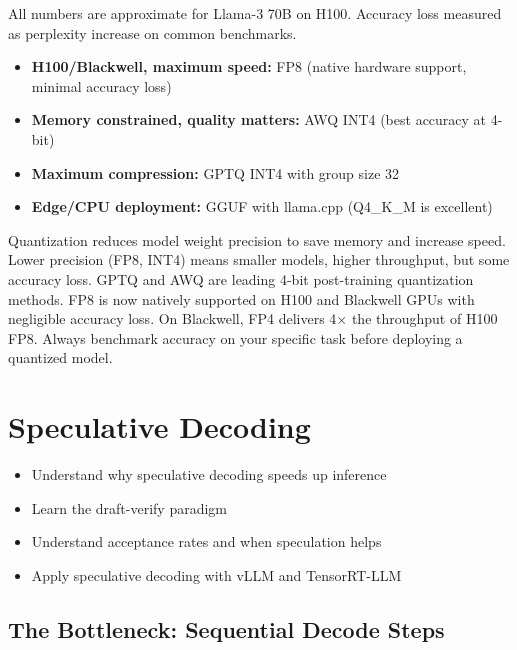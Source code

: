 \documentclass[10pt, oneside, openany]{book}
\newcommand{\tipbox}[2]{\begin{tcolorbox}[tipstyle, title={#1}]#2\end{tcolorbox}}
\newenvironment{learningobjectives}
  {\begin{tcolorbox}[enhanced, breakable,
    colback={rgb,255:red,232;green,240;blue,255},
    colframe=NavyBlue, boxrule=1.5pt, arc=4pt,
    title={\bfseries Learning Objectives},
    fonttitle=\bfseries\color{white},
    attach boxed title to top left={yshift=-2mm, xshift=5mm},
    boxed title style={colback=NavyBlue, arc=2pt}]
  \begin{itemize}[leftmargin=1.5em, itemsep=2pt]}
  {\end{itemize}\end{tcolorbox}}
\newenvironment{chapsummary}
  {\begin{tcolorbox}[enhanced, breakable,
    colback={rgb,255:red,245;green,245;blue,225},
    colframe=AccentOrange, boxrule=1.5pt, arc=4pt,
    title={\bfseries Chapter Summary},
    fonttitle=\bfseries\color{white},
    attach boxed title to top left={yshift=-2mm, xshift=5mm},
    boxed title style={colback=AccentOrange, arc=2pt}]}
  {\end{tcolorbox}}
\begin{document}
\noindent All numbers are approximate for Llama-3 70B on H100.  Accuracy loss
measured as perplexity increase on common benchmarks.

\tipbox{Which Quantization to Choose?}{
\begin{itemize}
  \item \textbf{H100/Blackwell, maximum speed:} FP8 (native hardware support,
        minimal accuracy loss)
  \item \textbf{Memory constrained, quality matters:} AWQ INT4 (best accuracy
        at 4-bit)
  \item \textbf{Maximum compression:} GPTQ INT4 with group size 32
  \item \textbf{Edge/CPU deployment:} GGUF with llama.cpp (Q4\_K\_M is excellent)
\end{itemize}
}

\begin{chapsummary}
Quantization reduces model weight precision to save memory and increase speed.
Lower precision (FP8, INT4) means smaller models, higher throughput, but some
accuracy loss.  GPTQ and AWQ are leading 4-bit post-training quantization methods.
FP8 is now natively supported on H100 and Blackwell GPUs with negligible accuracy
loss.  On Blackwell, FP4 delivers 4$\times$ the throughput of H100 FP8.  Always
benchmark accuracy on your specific task before deploying a quantized model.
\end{chapsummary}

\chapter{Speculative Decoding}
\label{ch:speculative}

\begin{learningobjectives}
  \item Understand why speculative decoding speeds up inference
  \item Learn the draft-verify paradigm
  \item Understand acceptance rates and when speculation helps
  \item Apply speculative decoding with vLLM and TensorRT-LLM
\end{learningobjectives}

\section{The Bottleneck: Sequential Decode Steps}
\end{document}
